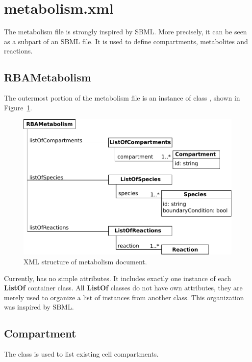 
\section{metabolism.xml}

The metabolism file is strongly inspired by SBML.\@
More precisely, it can be seen as a subpart of an SBML file.
It is used to define compartments, metabolites and reactions.


\subsection{RBAMetabolism}
\label{sec:rba_metabolism}

The outermost portion of the metabolism file is an instance of class
\rbametabolism, shown in Figure~\ref{fig:metabolism_doc}.

\begin{figure}
  \centering
  \includegraphics[scale=0.8]{figures/metabolism_doc}
  \caption{XML structure of metabolism document.}
\label{fig:metabolism_doc}
\end{figure}

Currently, \rbametabolism{} has no simple attributes.
It includes exactly one instance of each \textbf{ListOf} container class.
All \textbf{ListOf} classes do not have own attributes,
they are merely used to organize a list of instances from another class.
This organization was inspired by SBML.\@


\subsection{Compartment}
\label{sec:compartment}

The \compartment{} class is used to list existing cell compartments.

